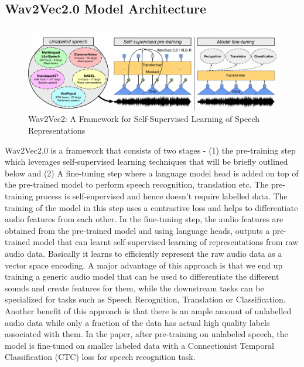\subsection{Wav2Vec2.0 Model Architecture}%
\label{sec:wav2vec2}



\begin{figure} [H]
    \centering
    \includegraphics[width=1.0\textwidth]{03-Theoretical Foundations/figures/wav2vec2 asr.pdf}
    \caption{Wav2Vec2: A Framework for Self-Supervised
Learning of Speech Representations}
    \label{fig:wav2vec2}
\end{figure}


Wav2Vec2.0 is a framework that consists of two stages - (1) the pre-training step which leverages self-supervised learning techniques that will be briefly outlined below and (2) A fine-tuning step where a language model head is added on top of the pre-trained model to perform speech recognition, translation etc. The pre-training process is self-supervised and hence doesn't require labelled data. The training of the model in this step uses a contrastive loss and helps to differentiate audio features from each other. In the fine-tuning step, the audio features are obtained from the pre-trained model and using language heads, outputs a pre-trained model that can learnt  self-supervised learning of representations from raw audio data. Basically it learns to efficiently represent the raw audio data as a vector space encoding. A major advantage of this approach is that we end up training a generic audio model that can be used to differentiate the different sounds and create features for them, while the downstream tasks can be specialized for tasks such as Speech Recognition, Translation or Classification. Another benefit of this approach is that there is an ample amount of unlabelled audio data while only a fraction of the data has actual high quality labels associated with them. In the paper, after pre-training on unlabeled speech, the model is fine-tuned on smaller labeled data with a Connectionist Temporal Classification (CTC) loss for speech recognition task.

